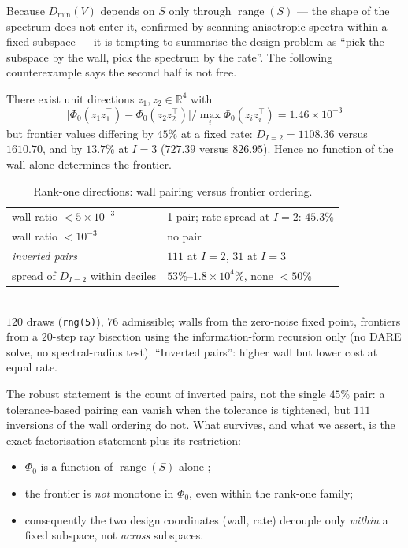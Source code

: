 Because $D_{\min}(V)$ depends on $S$ only through $\operatorname{range}(S)$ ---
the shape of the spectrum does not enter it, confirmed by scanning anisotropic
spectra within a fixed subspace --- it is tempting to summarise the design
problem as ``pick the subspace by the wall, pick the spectrum by the rate''.
The following counterexample says the second half is not free.

\begin{proposition}
\label{pr:nofactor}
There exist unit directions $z_1,z_2\in\mathbb R^{4}$ with
\[
 \big|\Phi_0(z_1z_1^{\top})-\Phi_0(z_2z_2^{\top})\big|
 \big/\max_i\Phi_0(z_iz_i^{\top}) = 1.46\times10^{-3}
\]
but frontier values differing by $45\%$ at a fixed rate:
$D_{I=2}=1108.36$ versus $1610.70$, and by $13.7\%$ at $I=3$ ($727.39$ versus
$826.95$). Hence no function of the wall alone determines the frontier.
\end{proposition}

\begin{table}[h]
 \centering\caption{Rank-one directions: wall pairing versus frontier
 ordering.}
 \label{tab:nofactor}
 \begin{tabularx}{\columnwidth}{Xl}
 \hline
 wall ratio $<5\times10^{-3}$ & 1 pair; rate spread at $I=2$: $45.3\%$ \\
 wall ratio $<10^{-3}$ & no pair \\
 \emph{inverted pairs} & $111$ at $I=2$, $31$ at $I=3$ \\
 spread of $D_{I=2}$ within deciles & $53\%$--$1.8\times10^{4}\%$, none $<50\%$ \\
 \hline
 \end{tabularx}
 \\[1pt]{\scriptsize $120$ draws (\texttt{rng(5)}), $76$ admissible; walls from
 the zero-noise fixed point, frontiers from a $20$-step ray bisection using the
 information-form recursion only (no DARE solve, no spectral-radius test).
 ``Inverted pairs'': higher wall but lower cost at equal rate.}
\end{table}

The robust statement is the count of inverted pairs, not the single $45\%$
pair: a tolerance-based pairing can vanish when the tolerance is tightened, but
$111$ inversions of the wall ordering do not. What survives, and what we assert,
is the exact factorisation statement plus its restriction:
\begin{itemize}
 \item $\Phi_0$ is a function of $\operatorname{range}(S)$ alone
;
 \item the frontier is \emph{not} monotone in $\Phi_0$, even within the rank-one
 family;
 \item consequently the two design coordinates (wall, rate) decouple only
 \emph{within} a fixed subspace, not \emph{across} subspaces.
\end{itemize}


